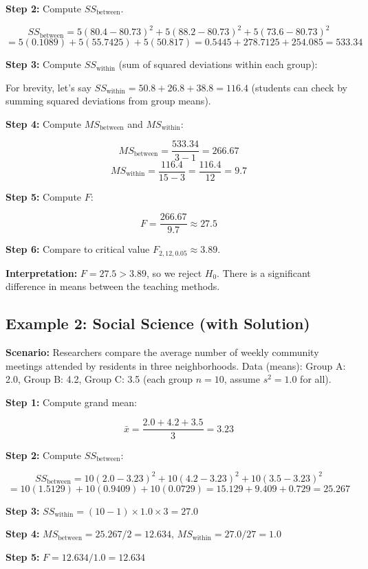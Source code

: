 \documentclass[11pt]{article}
\begin{document}
\textbf{Step 2:} Compute $SS_{\text{between}}$.

\[
SS_{\text{between}} = 5(80.4-80.73)^2 + 5(88.2-80.73)^2 + 5(73.6-80.73)^2
\]
\[
= 5(0.1089) + 5(55.7425) + 5(50.817)
= 0.5445 + 278.7125 + 254.085
= 533.34
\]

\textbf{Step 3:} Compute $SS_{\text{within}}$ (sum of squared deviations within each group):

For brevity, let's say $SS_{\text{within}} = 50.8 + 26.8 + 38.8 = 116.4$ (students can check by summing squared deviations from group means).

\textbf{Step 4:} Compute $MS_{\text{between}}$ and $MS_{\text{within}}$:

\[
MS_{\text{between}} = \frac{533.34}{3-1} = 266.67
\]
\[
MS_{\text{within}} = \frac{116.4}{15-3} = \frac{116.4}{12} = 9.7
\]

\textbf{Step 5:} Compute $F$:

\[
F = \frac{266.67}{9.7} \approx 27.5
\]

\textbf{Step 6:} Compare to critical value $F_{2,12,0.05} \approx 3.89$.

\textbf{Interpretation:} $F = 27.5 > 3.89$, so we reject $H_0$. There is a significant difference in means between the teaching methods.

\subsection{Example 2: Social Science (with Solution)}
\textbf{Scenario:} Researchers compare the average number of weekly community meetings attended by residents in three neighborhoods. Data (means): Group A: 2.0, Group B: 4.2, Group C: 3.5 (each group $n=10$, assume $s^2=1.0$ for all).

\textbf{Step 1:} Compute grand mean:

\[
\bar{x} = \frac{2.0 + 4.2 + 3.5}{3} = 3.23
\]

\textbf{Step 2:} Compute $SS_{\text{between}}$:

\[
SS_{\text{between}} = 10(2.0-3.23)^2 + 10(4.2-3.23)^2 + 10(3.5-3.23)^2
\]
\[
= 10(1.5129) + 10(0.9409) + 10(0.0729) = 15.129 + 9.409 + 0.729 = 25.267
\]

\textbf{Step 3:} $SS_{\text{within}} = (10-1)\times 1.0 \times 3 = 27.0$

\textbf{Step 4:} $MS_{\text{between}} = 25.267/2 = 12.634$, $MS_{\text{within}} = 27.0/27 = 1.0$

\textbf{Step 5:} $F = 12.634/1.0 = 12.634$
\end{document}
